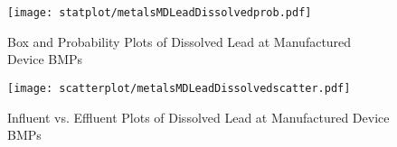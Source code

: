         \begin{figure}[hb]   %
            \centering
            \texttt{[image: statplot/metalsMDLeadDissolvedprob.pdf]}
            \caption{Box and Probability Plots of Dissolved Lead at Manufactured Device BMPs}
        \end{figure}         %
        
        
        \begin{figure}[hb]   %
            \centering
            \texttt{[image: scatterplot/metalsMDLeadDissolvedscatter.pdf]}
            \caption{Influent vs. Effluent Plots of Dissolved Lead at Manufactured Device BMPs}
        \end{figure}         %
        \clearpage
        